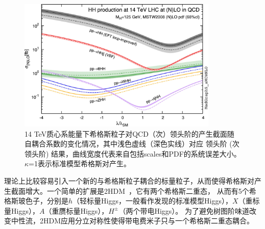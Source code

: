 \begin{figure}[h]
\centering
 \includegraphics[width=0.85\textwidth]{fig/HH_xs_kappa_14TeV.jpg}
  \caption{14 TeV质心系能量下希格斯粒子对QCD（次）领头阶的产生截面随自耦合系数的变化情况，其中浅色虚线（深色实线）对应 领头阶 (次领头阶) 结果，曲线宽度代表来自包括scales和PDF的系统误差大小。 
  $\kappa$=1表示标准模型希格斯对产生。}
  \label{fig:HH_xs_kappa_14TeV}
\end{figure}

理论上比较容易引入一个新的与希格斯粒子耦合的标量粒子，从而使得希格斯对产生截面增大。一个简单的扩展是2HDM~\cite{2HDMTheory}，它有两个希格斯二重态，
从而有5个希格斯玻色子，分别是$h$（轻标量Higgs，一般看作发现的标准模型Higgs），$X$（重标量Higgs），$A$（重赝标量Higgs），$H^{\pm}$（两个带电Higgs）。
为了避免树图阶味道改变中性流，2HDM应用分立对称性使得带电费米子只与一个希格斯二重态耦合。


